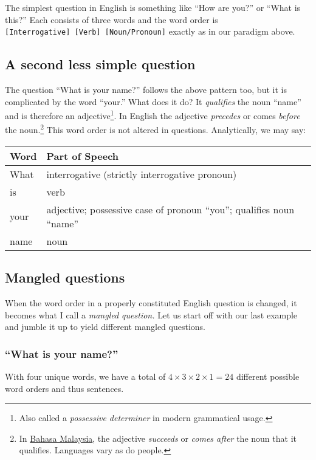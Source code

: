 \documentclass[
  12pt,
  a4paper,
]{article}
\begin{document}
The simplest question in English is something like ``How are you?'' or
``What is this?'' Each consists of three words and the word order is
\texttt{{[}Interrogative{]}\ {[}Verb{]}\ {[}Noun/Pronoun{]}} exactly as
in our paradigm above.

\hypertarget{a-second-less-simple-question}{%
\subsection{A second less simple
question}\label{a-second-less-simple-question}}

The question ``What is your name?'' follows the above pattern too, but
it is complicated by the word ``your.'' What does it do? It
\emph{qualifies} the noun ``name'' and is therefore an
adjective\footnote{Also called a \emph{possessive determiner} in modern
  grammatical usage.}. In English the adjective \emph{precedes} or comes
\emph{before} the noun.\footnote{In
  \href{http://en.wikipedia.org/wiki/Bahasa_Malaysia}{Bahasa Malaysia},
  the adjective \emph{succeeds} or \emph{comes after} the noun that it
  qualifies. Languages vary as do people.} This word order is not
altered in questions. Analytically, we may say:

\begin{longtable}[]{@{}ll@{}}
\toprule
Word & Part of Speech\tabularnewline
\midrule
\endhead
What & interrogative (strictly interrogative pronoun)\tabularnewline
is & verb\tabularnewline
your & adjective; possessive case of pronoun ``you''; qualifies noun
``name''\tabularnewline
name & noun\tabularnewline
\bottomrule
\end{longtable}

\hypertarget{mangled-questions}{%
\subsection{Mangled questions}\label{mangled-questions}}

When the word order in a properly constituted English question is
changed, it becomes what I call a \emph{mangled question.} Let us start
off with our last example and jumble it up to yield different mangled
questions.

\hypertarget{what-is-your-name-1}{%
\subsubsection{``What is your name?''}\label{what-is-your-name-1}}

With four unique words, we have a total of
\(4 \times 3 \times 2 \times 1 = 24\) different possible word orders and
thus sentences.
\end{document}
